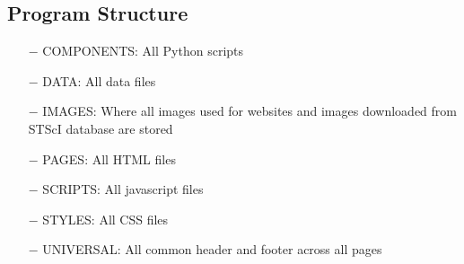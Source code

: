 \documentclass[12pt,letterpaper]{article}
\begin{document}
\subsection*{Program Structure}
\begin{enumerate}
  \item [$-$] COMPONENTS: All Python scripts
  \item [$-$] DATA: All data files
  \item [$-$] IMAGES: Where all images used for websites and images downloaded from STScI database are stored
  \item [$-$] PAGES: All HTML files
  \item [$-$] SCRIPTS: All javascript files
  \item [$-$] STYLES: All CSS files
  \item [$-$] UNIVERSAL: All common header and footer across all pages
\end{enumerate}
\end{document}
